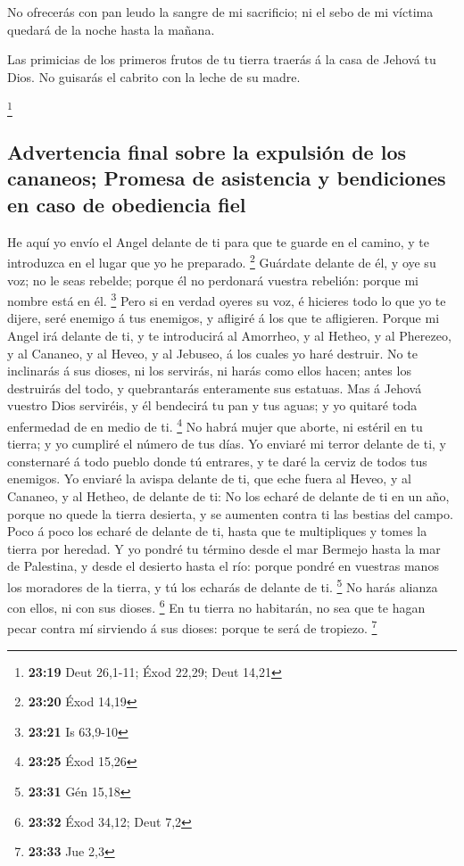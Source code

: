  No ofrecerás con pan leudo la sangre de mi sacrificio; ni
el sebo de mi víctima quedará de la noche hasta la mañana.

 Las primicias de los primeros frutos de tu tierra traerás
á la casa de Jehová tu Dios. No guisarás el cabrito con la leche de su
madre.

\footnote{\textbf{23:19} Deut 26,1-11; Éxod 22,29; Deut 14,21}

\hypertarget{advertencia-final-sobre-la-expulsiuxf3n-de-los-cananeos-promesa-de-asistencia-y-bendiciones-en-caso-de-obediencia-fiel}{%
\subsection{Advertencia final sobre la expulsión de los cananeos;
Promesa de asistencia y bendiciones en caso de obediencia
fiel}\label{advertencia-final-sobre-la-expulsiuxf3n-de-los-cananeos-promesa-de-asistencia-y-bendiciones-en-caso-de-obediencia-fiel}}

 He aquí yo envío el Angel delante de ti para que te guarde
en el camino, y te introduzca en el lugar que yo he preparado.
\footnote{\textbf{23:20} Éxod 14,19}  Guárdate delante de
él, y oye su voz; no le seas rebelde; porque él no perdonará vuestra
rebelión: porque mi nombre está en él. \footnote{\textbf{23:21} Is
  63,9-10}  Pero si en verdad oyeres su voz, é hicieres
todo lo que yo te dijere, seré enemigo á tus enemigos, y afligiré á los
que te afligieren.  Porque mi Angel irá delante de ti, y te
introducirá al Amorrheo, y al Hetheo, y al Pherezeo, y al Cananeo, y al
Heveo, y al Jebuseo, á los cuales yo haré destruir.  No te
inclinarás á sus dioses, ni los servirás, ni harás como ellos hacen;
antes los destruirás del todo, y quebrantarás enteramente sus estatuas.
 Mas á Jehová vuestro Dios serviréis, y él bendecirá tu pan
y tus aguas; y yo quitaré toda enfermedad de en medio de ti. \footnote{\textbf{23:25}
  Éxod 15,26}  No habrá mujer que aborte, ni estéril en tu
tierra; y yo cumpliré el número de tus días.  Yo enviaré mi
terror delante de ti, y consternaré á todo pueblo donde tú entrares, y
te daré la cerviz de todos tus enemigos.  Yo enviaré la
avispa delante de ti, que eche fuera al Heveo, y al Cananeo, y al
Hetheo, de delante de ti:  No los echaré de delante de ti
en un año, porque no quede la tierra desierta, y se aumenten contra ti
las bestias del campo.  Poco á poco los echaré de delante
de ti, hasta que te multipliques y tomes la tierra por heredad.
 Y yo pondré tu término desde el mar Bermejo hasta la mar
de Palestina, y desde el desierto hasta el río: porque pondré en
vuestras manos los moradores de la tierra, y tú los echarás de delante
de ti. \footnote{\textbf{23:31} Gén 15,18}  No harás
alianza con ellos, ni con sus dioses. \footnote{\textbf{23:32} Éxod
  34,12; Deut 7,2}  En tu tierra no habitarán, no sea que
te hagan pecar contra mí sirviendo á sus dioses: porque te será de
tropiezo. \footnote{\textbf{23:33} Jue 2,3}

